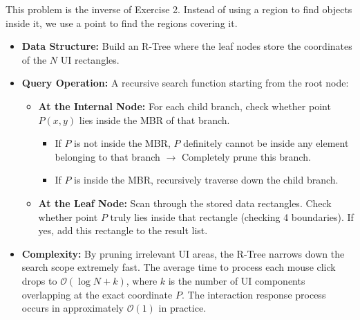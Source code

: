 \documentclass[a4paper, 10pt, titlepage]{report}
\begin{document}
This problem is the inverse of Exercise 2. Instead of using a region to find objects inside it, we use a point to find the regions covering it.
\begin{itemize}
    \item \textbf{Data Structure:} Build an R-Tree where the leaf nodes store the coordinates of the $N$ UI rectangles.
    \item \textbf{Query Operation:} A recursive search function starting from the root node:
    \begin{itemize}
        \item \textbf{At the Internal Node:} For each child branch, check whether point $P(x, y)$ lies inside the MBR of that branch.
        \begin{itemize}
            \item If $P$ is not inside the MBR, $P$ definitely cannot be inside any element belonging to that branch $\rightarrow$ Completely prune this branch.
            \item If $P$ is inside the MBR, recursively traverse down the child branch.
        \end{itemize}
        \item \textbf{At the Leaf Node:} Scan through the stored data rectangles. Check whether point $P$ truly lies inside that rectangle (checking 4 boundaries). If yes, add this rectangle to the result list.
    \end{itemize}
    \item \textbf{Complexity:} By pruning irrelevant UI areas, the R-Tree narrows down the search scope extremely fast. The average time to process each mouse click drops to $\mathcal{O}(\log N + k)$, where $k$ is the number of UI components overlapping at the exact coordinate $P$. The interaction response process occurs in approximately $\mathcal{O}(1)$ in practice.
\end{itemize}

\newpage


\newpage
\end{document}
